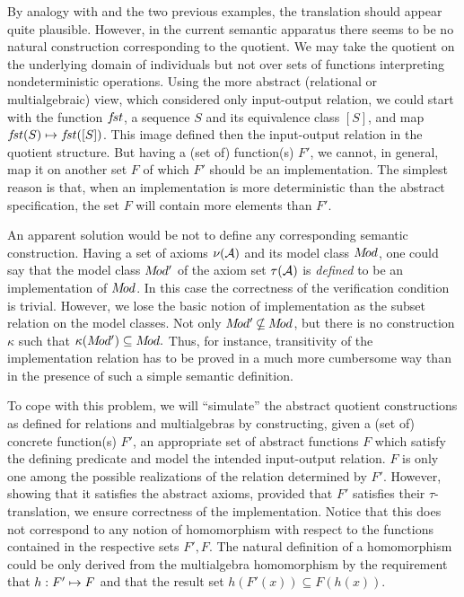 By analogy with  and the two previous examples, the translation
 should appear quite plausible. However, in the current 
semantic apparatus there seems to be no natural construction corresponding to the quotient. We may take the quotient on the underlying domain of individuals but
not over sets of functions interpreting nondeterministic operations. Using the more abstract (relational or multialgebraic) view, which considered only input-output relation, we could start with the function $f\!st$, a sequence
$S$ and its equivalence class $[S]$, and map $f\!st(S)\mathrel{\mapsto} f\!st([S])$. This image defined then the input-output relation in the quotient structure. But having a (set of) function(s) $F'$, we cannot, in general, map it on another set $F$ of which $F'$ should be an implementation. The simplest reason is that,
when an implementation is more deterministic than the abstract specification, the set $F$ will contain more elements than $F'$. 

An apparent solution would be not to define any corresponding semantic construction. Having a set of axioms $\nu({\cal A})$ and its model class $M\!od$, one
could say that the model class $M\!od'$ of the axiom set $\tau({\cal A})$ is {\em defined}
to be an implementation of $M\!od$. In this case the correctness of the verification condition is trivial. However, we lose the basic notion of implementation as the subset relation on the model classes. Not only $\Mod'\Not\subseteq \Mod$, but there is no construction $\kappa$ such that $\kappa(M\!od')\subseteq M\!od.$ Thus, for instance, transitivity of the implementation relation has to be proved in a much more cumbersome way than in the presence of such a simple semantic definition. 

To cope with this problem, we will ``simulate'' the abstract quotient constructions as defined for relations and multialgebras by constructing, given a (set of) concrete function(s) $F'$, an appropriate set of abstract functions $F$
which satisfy the defining predicate and model the intended input-output relation.
$F$ is only one among the possible realizations of the relation determined by $F'$. However, showing that it satisfies the abstract axioms, provided that $F'$ satisfies their $\tau$-translation, we ensure correctness of the implementation. Notice that this does not correspond to any notion of homomorphism with respect to the functions contained in the respective sets $F',F.$
The natural definition of a homomorphism could be only derived from the multialgebra homomorphism by the requirement that $h:F'\mathrel{\mapsto} F$ and that the result set $h(F'(x))\subseteq F(h(x)).$

